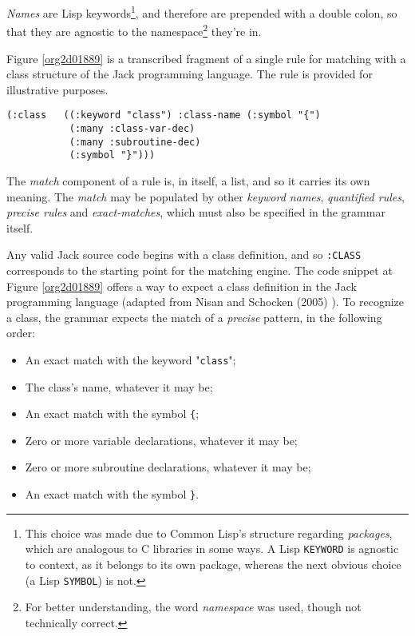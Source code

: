 \documentclass[a4paper,11pt,oneside]{article}
\begin{document}
\emph{Names} are Lisp keywords\footnote{This choice was made due to Common Lisp's structure regarding
\emph{packages}, which are analogous to C libraries in some ways. A Lisp
\texttt{KEYWORD} is agnostic to context, as it belongs to its own package,
whereas the next obvious choice (a Lisp \texttt{SYMBOL}) is not.}, and therefore are prepended with a
double colon, so that they are agnostic to the namespace\footnote{For better understanding, the word \emph{namespace} was used, though
not technically correct.} they're
in.

Figure \ref{org2d01889} is a transcribed fragment of a single rule
for matching with a class structure of the Jack programming
language. The rule is provided for illustrative purposes.

\begin{verbatim}
(:class   ((:keyword "class") :class-name (:symbol "{")
           (:many :class-var-dec)
           (:many :subroutine-dec)
           (:symbol "}")))
\end{verbatim}
\hfill \break

The \emph{match} component of a rule is, in itself, a list, and so it carries
its own meaning. The \emph{match} may be populated by other \emph{keyword names},
\emph{quantified rules}, \emph{precise rules} and \emph{exact-matches}, which must also be
specified in the grammar itself.

Any valid Jack source code begins with a class definition, and so
\texttt{:CLASS} corresponds to the starting point for the matching engine. The
code snippet at Figure \ref{org2d01889} offers a way to expect a class
definition in the Jack programming language (adapted from Nisan and
Schocken (2005) \cite{nand2tetris}). To recognize a class, the grammar
expects the match of a \emph{precise} pattern, in the following order:

\begin{itemize}
\item An exact match with the keyword "\texttt{class}";
\item The class's name, whatever it may be;
\item An exact match with the symbol \texttt{\{};
\item Zero or more variable declarations, whatever it may be;
\item Zero or more subroutine declarations, whatever it may be;
\item An exact match with the symbol \texttt{\}}.
\end{itemize}
\end{document}
